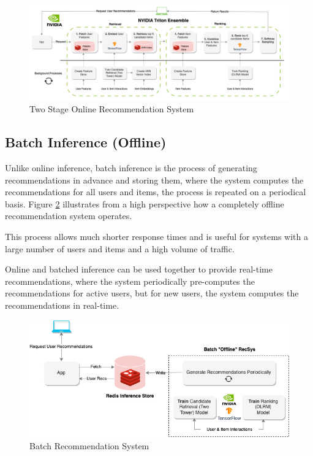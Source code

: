 \begin{figure}[H]
    \centering
    \includegraphics[width=1\textwidth]{assets/online-two-stage-recommender-pipeline.png}
    \caption[Two Stage Online Recommendation System]{Two Stage Online Recommendation System \cite{NvidiaFeatureStores}}
    \label{fig:TwoStageOnline}
\end{figure}



\subsection{Batch Inference (Offline)}
Unlike online inference, batch inference is the process of generating recommendations in advance and storing them, 
where the system computes the recommendations for all users and items, 
the process is repeated on a periodical basis.\cite{NvidiaFeatureStores} 
Figure \ref{fig:BatchRecSys} illustrates from a high perspective how a completely offline recommendation system operates.

This process allows much shorter response times and is useful for systems with a large number of users and items and a high volume of traffic.

Online and batched inference can be used together to provide real-time recommendations, where the system periodically pre-computes the recommendations for active users, but for new users, the system computes the recommendations in real-time.

\begin{figure}[H]
    \centering
    \includegraphics[width=1\textwidth]{assets/batch-recommendation-system.png}
    \caption[Batch Recommendation System]{Batch Recommendation System \cite{NvidiaFeatureStores}}
    \label{fig:BatchRecSys}
\end{figure}